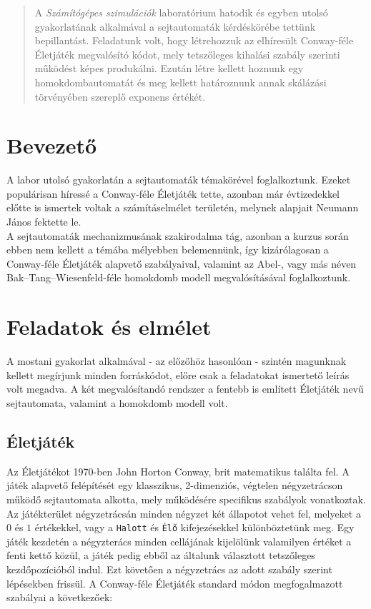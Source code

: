 \begin{abstract}
    \noindent A \emph{Számítógépes szimulációk} laboratórium hatodik és egyben utolsó gyakorlatának alkalmával a sejtautomaták kérdéskörébe tettünk bepillantást. Feladatunk volt, hogy létrehozzuk az elhíresült Conway-féle Életjáték megvalósító kódot, mely tetszőleges kihalási szabály szerinti működést képes produkálni. Ezután létre kellett hoznunk egy homokdombautomatát és meg kellett határoznunk annak skálázási törvényében szereplő exponens értékét.
\end{abstract}

\begin{multicols}{2}

\section{Bevezető} \label{sec:1}
A labor utolsó gyakorlatán a sejtautomaták témakörével foglalkoztunk. Ezeket populárisan híressé a Conway-féle Életjáték tette, azonban már évtizedekkel előtte is ismertek voltak a számításelmélet területén, melynek alapjait Neumann János fektette le. \\
A sejtautomaták mechanizmusának szakirodalma tág, azonban a kurzus során ebben nem kellett a témába mélyebben belemennünk, így kizárólagosan a Conway-féle Életjáték alapvető szabályaival, valamint az Abel-, vagy más néven Bak--Tang--Wiesenfeld-féle homokdomb modell megvalósításával foglalkoztunk.

\section{Feladatok és elmélet} \label{sec:2}
A mostani gyakorlat alkalmával - az előzőhöz hasonlóan - szintén magunknak kellett megírjunk minden forráskódot, előre csak a feladatokat ismertető leírás volt megadva. A két megvalósítandó rendszer a fentebb is említett Életjáték nevű sejtautomata, valamint a homokdomb modell volt.

\subsection{Életjáték} \label{sub:2.1}
Az Életjátékot 1970-ben John Horton Conway, brit matematikus találta fel. A játék alapvető felépítését egy klasszikus, 2-dimenziós, végtelen négyzetrácson működő sejtautomata alkotta, mely működésére specifikus szabályok vonatkoztak. Az játékterület négyzetrácsán minden négyzet két állapotot vehet fel, melyeket a $0$ és $1$ értékekkel, vagy a \texttt{Halott} és \texttt{Élő} kifejezésekkel különböztetünk meg. Egy játék kezdetén a négyzterács minden cellájának kijelölünk valamilyen értéket a fenti kettő közül, a játék pedig ebből az általunk választott tetszőleges kezdőpozícióból indul. Ezt követően a négyzetrács az adott szabály szerint lépésekben frissül. A Conway-féle Életjáték standard módon megfogalmazott szabályai a következőek:


\end{multicols}
